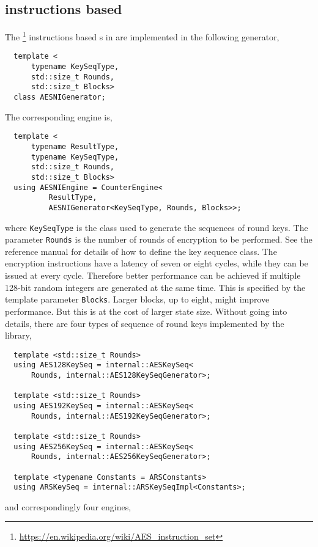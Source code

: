 \subsection{\texorpdfstring{\protect\aesni}{AES-NI} instructions based
  \texorpdfstring{\protect\rng}{RNG}}
\label{sub:AES-NI instructions based RNG}

The \aesni\footnote{\url{https://en.wikipedia.org/wiki/AES_instruction_set}}
instructions based \rng{}s in \textcite{Salmon:2011um} are implemented in the
following generator,
\begin{Verbatim}
  template <
      typename KeySeqType,
      std::size_t Rounds,
      std::size_t Blocks>
  class AESNIGenerator;
\end{Verbatim}
The corresponding \rng engine is,
\begin{Verbatim}
  template <
      typename ResultType,
      typename KeySeqType,
      std::size_t Rounds,
      std::size_t Blocks>
  using AESNIEngine = CounterEngine<
          ResultType,
          AESNIGenerator<KeySeqType, Rounds, Blocks>>;
\end{Verbatim}
where \verb|KeySeqType| is the class used to generate the sequences of round
keys. The parameter \verb|Rounds| is the number of rounds of \aes encryption to
be performed. See the reference manual for details of how to define the key
sequence class. The \aesni encryption instructions have a latency of seven or
eight cycles, while they can be issued at every cycle. Therefore better
performance can be achieved if multiple 128-bit random integers are generated
at the same time. This is specified by the template parameter \verb|Blocks|.
Larger blocks, up to eight, might improve performance. But this is at the cost
of larger state size. Without going into details, there are four types of
sequence of round keys implemented by the library,
\begin{Verbatim}
  template <std::size_t Rounds>
  using AES128KeySeq = internal::AESKeySeq<
      Rounds, internal::AES128KeySeqGenerator>;

  template <std::size_t Rounds>
  using AES192KeySeq = internal::AESKeySeq<
      Rounds, internal::AES192KeySeqGenerator>;

  template <std::size_t Rounds>
  using AES256KeySeq = internal::AESKeySeq<
      Rounds, internal::AES256KeySeqGenerator>;

  template <typename Constants = ARSConstants>
  using ARSKeySeq = internal::ARSKeySeqImpl<Constants>;
\end{Verbatim}
and correspondingly four \rng engines,
